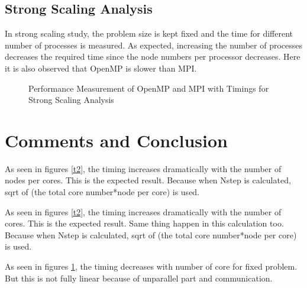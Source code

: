 \documentclass{article}
\begin{document}
\clearpage

\subsection{Strong Scaling Analysis}
In strong scaling study, the problem size is kept fixed and the time for different number of processes is measured. As expected, increasing the number of processes decreases the required time since the node numbers per processor decreases. Here it is also observed that OpenMP is slower than MPI. 

\begin{figure}[hbt!]
  \centering
  \caption{Performance Measurement of OpenMP and MPI with Timings for Strong Scaling Analysis}
  \label{t3}
\end{figure}

\clearpage

\section{Comments and Conclusion}


As seen in figures \ref{t2}, the timing increases dramatically with the number of nodes per cores. This is the expected result. Because when Nstep is calculated, sqrt of  (the total core number*node per core) is used.

As seen in figures \ref{t2}, the timing increases dramatically with the number of cores. This is the expected result. Same thing happen in this calculation too.  Because when Nstep is calculated, sqrt of  (the total core number*node per core) is used. 

As seen in figures \ref{t3}, the timing decreases with number of core for fixed problem. But this is not fully linear because of unparallel part and communication. 



\clearpage

\printbibliography
\end{document}
